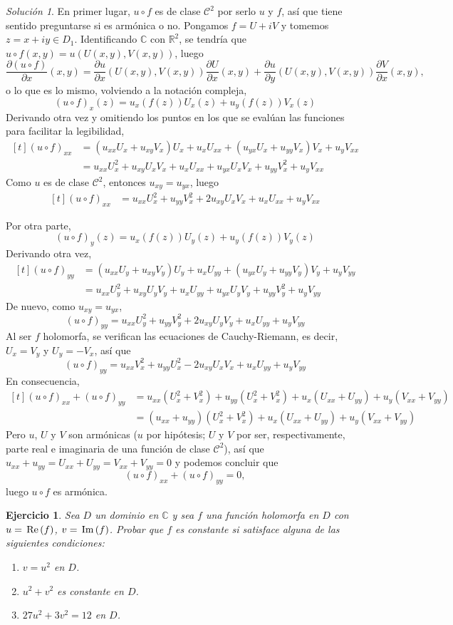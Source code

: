 \documentclass[11pt]{report}
\newcommand{\R}{\mathbb R}
\newcommand{\C}{\mathbb C}
\newcommand{\pars}[1]{\left( #1 \right)} %
\renewcommand{\Re}[1]{\,\textup{Re}\pars{#1}}
\renewcommand{\Im}[1]{\,\textup{Im}\pars{#1}}
\newcommand{\pder}[3][2]{\frac{\partial #2}{\partial #3}}
\newtheorem{exercise}{Ejercicio}
\theoremstyle{remark}
\newtheorem*{resolution}{Solución}
\begin{document}
\begin{resolution}
En primer lugar, $u \circ f$ es de clase $\mathcal{C}^2$ por serlo $u$ y $f$, así que tiene sentido preguntarse si es armónica o no. Pongamos $f = U+iV$ y tomemos $z = x+iy \in D_1$. Identificando $\C$ con $\R^2$, se tendría que $u \circ f(x,y) = u(U(x,y),V(x,y))$, luego
\[\pder{(u \circ f)}{x}(x,y) = \pder{u}{x}(U(x,y),V(x,y))\pder{U}{x}(x,y) + \pder{u}{y}(U(x,y),V(x,y))\pder{V}{x}(x,y),\]
o lo que es lo mismo, volviendo a la notación compleja,
\[(u \circ f)_x(z) = u_x(f(z))U_x(z)+u_y(f(z))V_x(z)\]
Derivando otra vez y omitiendo los puntos en los que se evalúan las funciones para facilitar la legibilidad,
\[
\begin{aligned}[t]
(u \circ f)_{xx} &= (u_{xx}U_x+u_{xy}V_x)U_x+u_xU_{xx}+(u_{yx}U_x+u_{yy}V_x)V_x+u_yV_{xx} \\
&= u_{xx}U_x^2+u_{xy}U_xV_x+u_xU_{xx}+u_{yx}U_xV_x+u_{yy}V_x^2+u_yV_{xx}
\end{aligned}
\]
Como $u$ es de clase $\mathcal{C}^2$, entonces $u_{xy} = u_{yx}$, luego
\[
\begin{aligned}[t]
(u \circ f)_{xx} &= u_{xx}U_x^2+u_{yy}V_x^2+2u_{xy}U_xV_x+u_xU_{xx}+u_yV_{xx}
\end{aligned}
\]
\end{resolution}
Por otra parte,
\[(u \circ f)_y(z) = u_x(f(z))U_y(z)+u_y(f(z))V_y(z)\]
Derivando otra vez,
\[
\begin{aligned}[t]
(u \circ f)_{yy} &= (u_{xx}U_y+u_{xy}V_y)U_y+u_xU_{yy}+(u_{yx}U_y+u_{yy}V_y)V_y+u_yV_{yy} \\
&= u_{xx}U_y^2+u_{xy}U_yV_y+u_xU_{yy}+u_{yx}U_yV_y+u_{yy}V_y^2+u_yV_{yy}
\end{aligned}
\]
De nuevo, como $u_{xy} = u_{yx}$,
\[(u \circ f)_{yy} = u_{xx}U_y^2+u_{yy}V_y^2+2u_{xy}U_yV_y+u_xU_{yy}+u_yV_{yy}\]
Al ser $f$ holomorfa, se verifican las ecuaciones de Cauchy-Riemann, es decir, $U_x = V_y$ y $U_y = -V_x$, así que
\[(u \circ f)_{yy} = u_{xx}V_x^2+u_{yy}U_x^2-2u_{xy}U_xV_x+u_xU_{yy}+u_yV_{yy}\]
En consecuencia,
\[
\begin{aligned}[t]
(u \circ f)_{xx}+(u \circ f)_{yy} &= u_{xx}(U_x^2+V_x^2)+u_{yy}(U_x^2+V_x^2)+u_x(U_{xx}+U_{yy})+u_y(V_{xx}+V_{yy}) \\
&= (u_{xx}+u_{yy})(U_x^2+V_x^2)+u_x(U_{xx}+U_{yy})+u_y(V_{xx}+V_{yy})
\end{aligned}
\]
Pero $u$, $U$ y $V$ son armónicas ($u$ por hipótesis; $U$ y $V$ por ser, respectivamente, parte real e imaginaria de una función de clase $\mathcal{C}^2$), así que $u_{xx}+u_{yy}=U_{xx}+U_{yy}=V_{xx}+V_{yy} = 0$ y podemos concluir que
\[(u \circ f)_{xx}+(u \circ f)_{yy} = 0,\]
luego $u \circ f$ es armónica.
\begin{exercise}
Sea $D$ un dominio en $\C$ y sea $f$ una función holomorfa en $D$ con $u = \Re{f}$, $v = \Im{f}$. Probar que $f$ es constante si satisface alguna de las siguientes condiciones:
\begin{enumerate}
    \item $v = u^2$ en $D$.
    \item $u^2+v^2$ es constante en $D$.
    \item $27u^2 +3v^2 = 12$ en $D$.
\end{enumerate}
\end{exercise}
\end{document}
